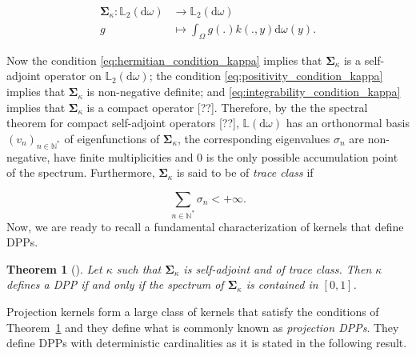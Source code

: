 \documentclass[twoside,11pt]{book}
\newtheorem{theorem}{Theorem}
\numberwithin{theorem}{chapter}
\numberwithin{definition}{chapter}
\numberwithin{proposition}{chapter}
\numberwithin{corollary}{chapter}
\numberwithin{example}{chapter}
\numberwithin{lemma}{chapter}
\begin{document}

\begin{align}
  \bm{\Sigma}_{\kappa} : \mathbb{L}_{2}(\mathrm{d}\omega) & \rightarrow \mathbb{L}_{2}(\mathrm{d}\omega) \nonumber \\
  g & \mapsto \int_{\Omega}g(.) k(.,y) \mathrm{d}\omega(y). \nonumber
\end{align}

Now the condition \eqref{eq:hermitian_condition_kappa} implies that $\bm{\Sigma}_{\kappa}$ is a self-adjoint operator on $\mathbb{L}_{2}(\mathrm{d}\omega)$; the condition \eqref{eq:positivity_condition_kappa} implies that $\bm{\Sigma}_{\kappa}$ is non-negative definite; and \eqref{eq:integrability_condition_kappa} implies that $\bm{\Sigma}_{\kappa}$ is a compact operator [??]. Therefore, by the the spectral theorem for compact self-adjoint operators [??], $\mathbb{L}(\mathrm{d}\omega)$ has an orthonormal basis $(v_{n})_{n \in \mathbb{N}^{*}}$ of eigenfunctions of $\bm{\Sigma}_{\kappa}$, the corresponding eigenvalues $\sigma_n$ are non-negative, have finite multiplicities and $0$ is the only possible accumulation point of the spectrum. Furthermore, $\bm{\Sigma}_{\kappa}$ is said to be of \emph{trace class} if

\begin{equation}\label{eq:traceclass_condition_kappa}
\sum\limits_{n \in \mathbb{N}^{*}} \sigma_n <+\infty.
\end{equation}
Now, we are ready to recall a fundamental characterization of kernels that define DPPs.




\begin{theorem} [\cite{Mac75,Sos00}] \label{thm:mac_sos}
Let $\kappa$ such that $\bm{\Sigma}_{\kappa}$ is self-adjoint and of trace class. 
Then $\kappa$ defines a DPP if and only if the spectrum of $\bm{\Sigma}_{\kappa}$ is contained in $[0,1]$.
\end{theorem}
Projection kernels form a large class of kernels that satisfy the conditions of Theorem~\ref{thm:mac_sos} and they define what is commonly known as \emph{projection DPPs}. They define DPPs with deterministic cardinalities as it is stated in the following result.
\end{document}
